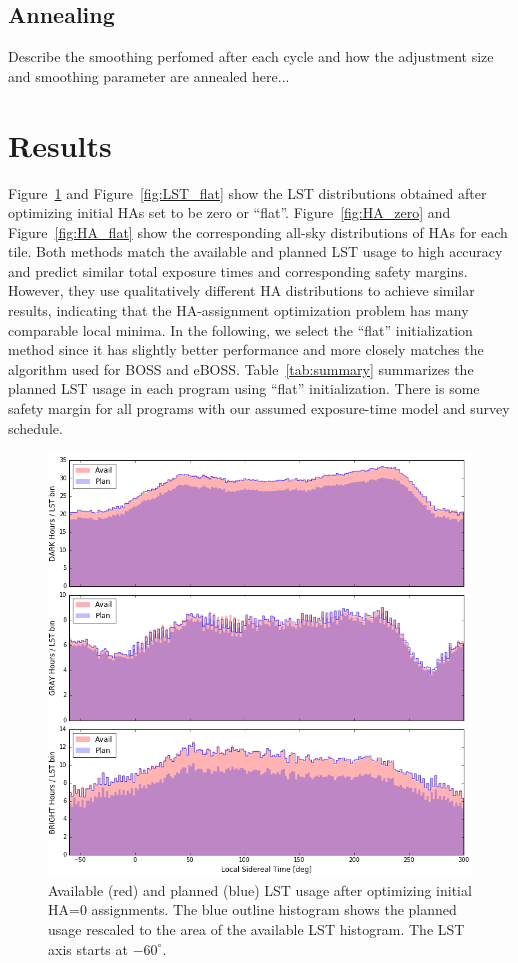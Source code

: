 \documentclass[12pt]{article}
\providecommand{\tab}[1]{Table~\ref{tab:#1}}
\providecommand{\fig}[1]{Figure~\ref{fig:#1}}
\begin{document}
\subsection{Annealing}

Describe the smoothing perfomed after each cycle and how the adjustment size and smoothing parameter are annealed here...

\section{Results}

\fig{LST_zero} and \fig{LST_flat} show the LST distributions obtained after optimizing initial HAs set to be zero or ``flat''.  \fig{HA_zero} and \fig{HA_flat} show the corresponding all-sky distributions of HAs for each tile.  Both methods match the available and planned LST usage to high accuracy and predict similar total exposure times and corresponding safety margins. However, they use qualitatively different HA distributions to achieve similar results, indicating that the HA-assignment optimization problem has many comparable local minima.  In the following, we select the ``flat'' initialization method since it has slightly better performance and more closely matches the algorithm used for BOSS and eBOSS.  \tab{summary} summarizes the planned LST usage in each program using ``flat'' initialization.  There is some safety margin for all programs with our assumed exposure-time model and survey schedule.

\begin{figure}[htb]
\begin{center}
\includegraphics[width=6in]{LST_zero}
\caption{Available (red) and planned (blue) LST usage after optimizing initial HA=0 assignments.  The blue outline histogram shows the planned usage rescaled to the area of the available LST histogram.  The LST axis starts at $-60^\circ$.}
\label{fig:LST_zero}
\end{center}
\end{figure}
\end{document}
